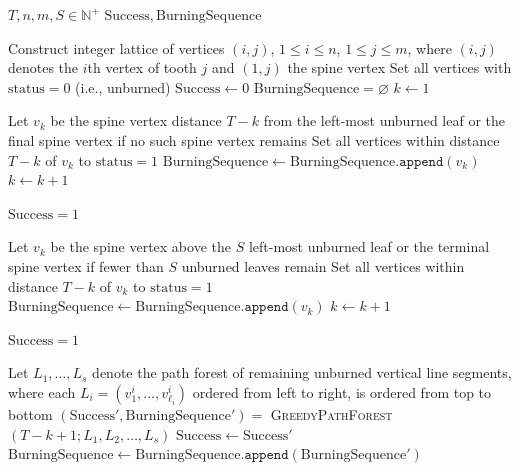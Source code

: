 \documentclass{article}
\begin{document}
\begin{algorithm}[ht]
\caption{\textsc{GreedyComb}$(T;n,m; S)$}
\label{alg:greedy_comb}
\begin{algorithmic}[1]
\Require $T,n,m,S \in \mathbb N^+$
\Ensure $\mathrm{Success}, \mathrm{BurningSequence}$

\State Construct integer lattice of vertices $(i,j)$, $1 \le i \le n$, $1 \le j \le m$, 
\Statex \hspace{1em} where $(i,j)$ denotes the $i$th vertex of tooth $j$ and $(1,j)$ the spine vertex
\State Set all vertices with $\mathrm{status}=0$ (i.e., unburned)
\State $\mathrm{Success} \gets 0$
\State $\mathrm{BurningSequence} = \varnothing$
\State $k \gets 1$



 
        \State Let $v_k$ be the spine vertex  distance $T-k$ from the left-most unburned leaf
        \Statex \hspace{4em} or the final spine vertex if no such spine vertex remains
        \State Set all vertices within distance $T-k$ of $v_k$ to $\mathrm{status}=1$
        \State $\mathrm{BurningSequence} \gets \mathrm{BurningSequence}.\texttt{append}(v_k)$
        \State $k \gets k+1$
    \EndWhile

        \State $\mathrm{Success} = 1$
        \Return
    \EndIf
\EndIf



 
    \State Let $v_k$ be the spine vertex above the $S$ left-most unburned leaf 
    \Statex \hspace{2em} or the terminal spine vertex if fewer than $S$ unburned leaves remain
    \State Set all vertices within distance $T-k$ of $v_k$ to $\mathrm{status}=1$
    \State $\mathrm{BurningSequence} \gets \mathrm{BurningSequence}.\texttt{append}(v_k)$
    \State $k \gets k+1$
    \medskip
    
        \State $\mathrm{Success} = 1$
        \Return
    \EndIf
\EndIf

{}

    \State Let $L_1,\ldots,L_s$ denote the path forest of remaining unburned vertical line segments, 
    \Statex \hspace{2em} where each $L_i = (v^i_1,\ldots,v^i_{\ell_i})$ ordered from left to right, is ordered from top to bottom
    \State $(\mathrm{Success}',\mathrm{BurningSequence}') = $ \textsc{GreedyPathForest}$(T-k+1; L_1,L_2,\ldots,L_s)$
    \State $\mathrm{Success} \gets \mathrm{Success}'$
    \State $\mathrm{BurningSequence} \gets \mathrm{BurningSequence}.\texttt{append}(\mathrm{BurningSequence}')$
\EndIf

\State \Return
\end{algorithmic}
\label{alg: comb}
\end{algorithm}
\end{document}
